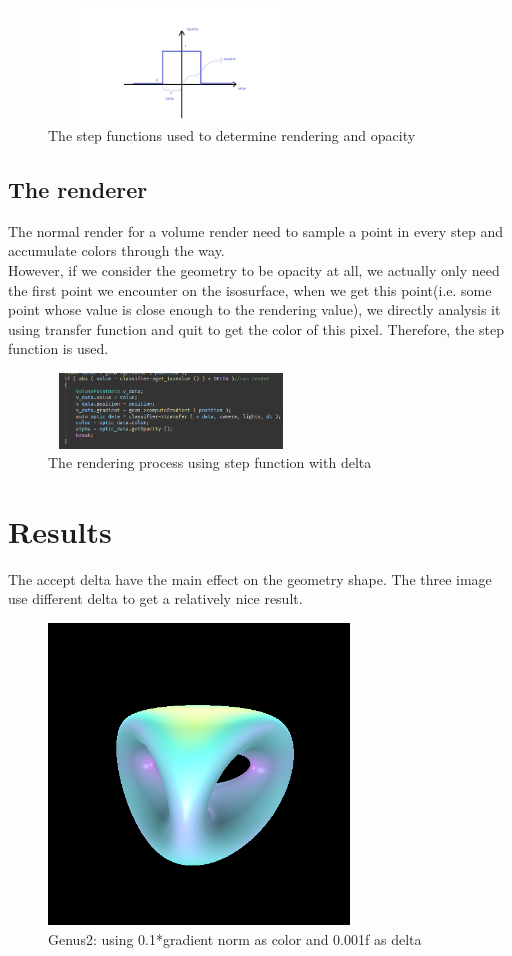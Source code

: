 \documentclass[acmtog]{acmart}
\begin{document}
\begin{figure}[h]
        \centering
        \includegraphics[width=7cm,height=3cm]{Step.png}
        \caption{The step functions used to determine rendering and opacity}
\end{figure}

\subsection{The renderer}
The normal render for a volume render need to sample a point in every step and accumulate colors through the way.\\
However, if we consider the geometry to be opacity at all, we actually only need the first point we encounter on the isosurface, when we get this point(i.e. some point whose value is close enough to the rendering value), we directly analysis it using transfer function and quit to get the color of this pixel. Therefore, the step function is used. 

\begin{figure}[h]
        \centering
        \includegraphics[width=6.5cm,height=2cm]{delta.png}
        \caption{The rendering process using step function with delta}
\end{figure}


\section{Results}

The accept delta have the main effect on the geometry shape. The three image use different delta to get a relatively nice result.

\begin{figure}[h]
        \centering
        \includegraphics[width=8cm,height=8cm]{genus2.png}
        \caption{Genus2: using 0.1*gradient norm as color and 0.001f as delta}
\end{figure}
\end{document}
